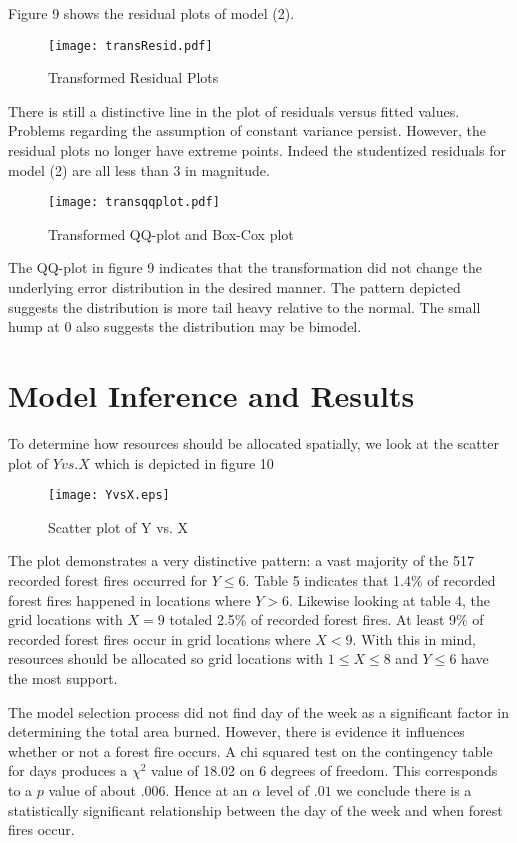 \documentclass[11pt]{report}
\begin{document}
Figure 9 shows the residual plots of model (2).
\begin{figure}[!htb]
\centering
\texttt{[image: transResid.pdf]}
\caption{Transformed Residual Plots}
\end{figure}

\noindent There is still a distinctive line in the plot of residuals versus fitted values. Problems regarding the assumption of constant variance persist. However, the residual plots no longer have extreme points. Indeed the studentized residuals for model (2) are all less than 3 in magnitude.

\begin{figure}[!htb]
\centering
\texttt{[image: transqqplot.pdf]}
\caption{Transformed QQ-plot and Box-Cox plot}
\end{figure}

The QQ-plot in figure 9 indicates that the transformation did not change the underlying error distribution in the desired manner. The pattern depicted suggests the distribution is more tail heavy relative to the normal. The small hump at 0 also suggests the distribution may be bimodel.
 

 
 
\section*{Model Inference and Results}
To determine how resources should be allocated spatially, we look at the scatter plot of $Y vs. X$ which is depicted in figure 10

\begin{figure}[!htb]
\centering
\texttt{[image: YvsX.eps]}
\caption{Scatter plot of Y vs. X}
\end{figure}

\noindent The plot demonstrates a very distinctive pattern: a vast majority of the 517 recorded forest fires occurred for
$Y \leq 6$. Table 5 indicates that 1.4\% of recorded forest fires happened in locations where $Y > 6$. Likewise looking at table 4, the grid locations with $X = 9$ totaled 2.5\% of recorded forest fires. At least 9\% of recorded forest fires occur in grid locations where $X < 9$. With this in mind, resources should be allocated so grid locations with $1 \leq X \leq 8$ and $Y \leq 6$ have the most support.

The model selection process did not find day of the week as a significant factor in determining the total area burned. However, there is evidence it influences whether or not a forest fire occurs. A chi squared test on the contingency table for days produces a $\chi^2$ value of 18.02 on 6 degrees of freedom. This corresponds to a $p$ value of about $.006$. Hence at an $\alpha$ level of $.01$ we conclude there is a statistically significant relationship between the day of the week and when forest fires occur. 
\end{document}
